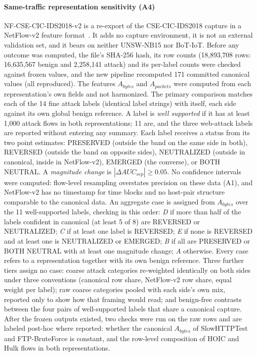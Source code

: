 \documentclass[preprint,12pt]{elsarticle}
\begin{document}
\paragraph{Same-traffic representation sensitivity (A4)} NF-CSE-CIC-IDS2018-v2 is a re-export of the CSE-CIC-IDS2018 capture in a NetFlow-v2 feature format~\cite{sarhan2021nfv2}. It adds no capture environment, it is not an external validation set, and it bears on neither UNSW-NB15 nor BoT-IoT. Before any outcome was computed, the file's SHA-256 hash, its row counts (18{,}893{,}708 rows: 16{,}635{,}567 benign and 2{,}258{,}141 attack) and its per-label counts were checked against frozen values, and the new pipeline recomputed 171 committed canonical values (all reproduced). The features $A_{bytes}$ and $A_{packets}$ were computed from each representation's own fields and not harmonized. The primary comparison matches each of the 14 fine attack labels (identical label strings) with itself, each side against its own global benign reference. A label is \emph{well supported} if it has at least 1{,}000 attack flows in both representations; 11 are, and the three web-attack labels are reported without entering any summary. Each label receives a status from its two point estimates: PRESERVED (outside the band on the same side in both), REVERSED (outside the band on opposite sides), NEUTRALIZED (outside in canonical, inside in NetFlow-v2), EMERGED (the converse), or BOTH NEUTRAL. A \emph{magnitude change} is $|\Delta AUC_{sep}|\ge 0.05$. No confidence intervals were computed: flow-level resampling overstates precision on these data (A1), and NetFlow-v2 has no timestamp for time blocks and no host-pair structure comparable to the canonical data. An aggregate case is assigned from $A_{bytes}$ over the 11 well-supported labels, checking in this order: \emph{D} if more than half of the labels confident in canonical (at least 5 of 8) are REVERSED or NEUTRALIZED; \emph{C} if at least one label is REVERSED; \emph{E} if none is REVERSED and at least one is NEUTRALIZED or EMERGED; \emph{B} if all are PRESERVED or BOTH NEUTRAL with at least one magnitude change; \emph{A} otherwise. Every case refers to a representation together with its own benign reference. Three further tiers assign no case: coarse attack categories re-weighted identically on both sides under three conventions (canonical row share, NetFlow-v2 row share, equal weight per label); raw coarse categories pooled with each side's own mix, reported only to show how that framing would read; and benign-free contrasts between the four pairs of well-supported labels that share a canonical capture. After the frozen outputs existed, two checks were run on the raw rows and are labeled post-hoc where reported: whether the canonical $A_{bytes}$ of SlowHTTPTest and FTP-BruteForce is constant, and the row-level composition of HOIC and Hulk flows in both representations.
\end{document}
